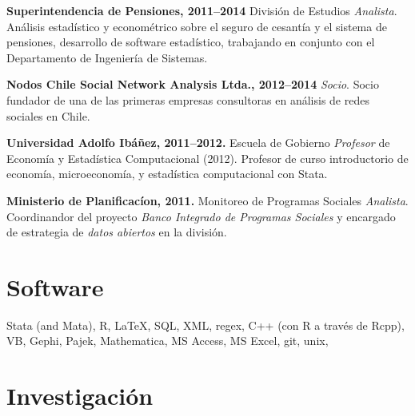 \documentclass[letterpaper, 11pt]{article}
\renewenvironment{itemize}{
  \begin{list}{}{
    \setlength{\leftmargin}{0.45cm}
  }
}{
  \end{list}
}
\begin{document}
\begin{itemize}
\item \textbf{Superintendencia de Pensiones, 2011--2014} Divisi\'on de Estudios \emph{Analista}. An\'alisis estad\'istico y econom\'etrico sobre el seguro de cesant\'ia y el sistema de pensiones, desarrollo de software estad\'istico, trabajando en conjunto con el Departamento de Ingenier\'ia de Sistemas.
\item \textbf{Nodos Chile Social Network Analysis Ltda., 2012--2014} \emph{Socio}.
Socio fundador de una de las primeras empresas consultoras en an\'alisis de redes sociales en Chile.
\item \textbf{Universidad Adolfo Ib\'a\~nez, 2011--2012.} Escuela de Gobierno \emph{Profesor} de Econom\'ia y Estad\'istica Computacional (2012).
Profesor de curso introductorio de econom\'ia, microeconom\'ia, y estad\'istica computacional con Stata.
\item \textbf{Ministerio de Planificac\'ion, 2011.} Monitoreo de Programas Sociales \emph{Analista}.
Coordinandor del proyecto \emph{Banco Integrado de Programas Sociales} y encargado de estrategia de \emph{datos abiertos} en la divisi\'on.
\end{itemize}

\section*{Software}

\begin{itemize}
\item[] Stata (and Mata), R, \LaTeX, SQL, XML, regex, C++ (con R a trav\'es de Rcpp), VB, Gephi, Pajek, Mathematica, MS Access, MS Excel, git, unix,
\end{itemize}

\section*{Investigaci\'on}
\end{document}
